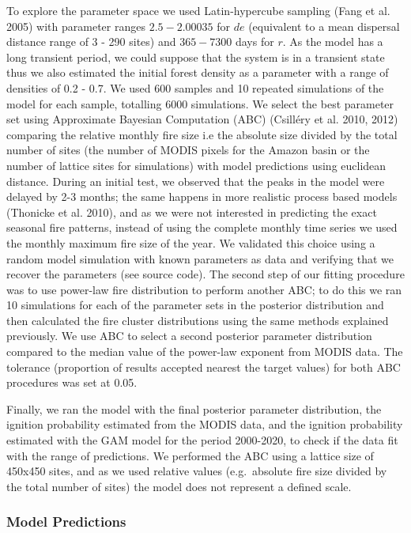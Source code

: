 \documentclass[
]{article}
\begin{document}
To explore the parameter space we used Latin-hypercube sampling (Fang et
al. 2005) with parameter ranges \(2.5 - 2.00035\) for \(de\) (equivalent
to a mean dispersal distance range of 3 - 290 sites) and \(365 - 7300\)
days for \(r\). As the model has a long transient period, we could
suppose that the system is in a transient state thus we also estimated
the initial forest density as a parameter with a range of densities of
0.2 - 0.7. We used 600 samples and 10 repeated simulations of the model
for each sample, totalling 6000 simulations. We select the best
parameter set using Approximate Bayesian Computation (ABC) (Csilléry et
al. 2010, 2012) comparing the relative monthly fire size i.e the
absolute size divided by the total number of sites (the number of MODIS
pixels for the Amazon basin or the number of lattice sites for
simulations) with model predictions using euclidean distance. During an
initial test, we observed that the peaks in the model were delayed by
2-3 months; the same happens in more realistic process based models
(Thonicke et al. 2010), and as we were not interested in predicting the
exact seasonal fire patterns, instead of using the complete monthly time
series we used the monthly maximum fire size of the year. We validated
this choice using a random model simulation with known parameters as
data and verifying that we recover the parameters (see source code). The
second step of our fitting procedure was to use power-law fire
distribution to perform another ABC; to do this we ran 10 simulations
for each of the parameter sets in the posterior distribution and then
calculated the fire cluster distributions using the same methods
explained previously. We use ABC to select a second posterior parameter
distribution compared to the median value of the power-law exponent from
MODIS data. The tolerance (proportion of results accepted nearest the
target values) for both ABC procedures was set at 0.05.

Finally, we ran the model with the final posterior parameter
distribution, the ignition probability estimated from the MODIS data,
and the ignition probability estimated with the GAM model for the period
2000-2020, to check if the data fit with the range of predictions. We
performed the ABC using a lattice size of 450x450 sites, and as we used
relative values (e.g.~absolute fire size divided by the total number of
sites) the model does not represent a defined scale.

\subsubsection{Model Predictions}\label{model-predictions}
\end{document}
